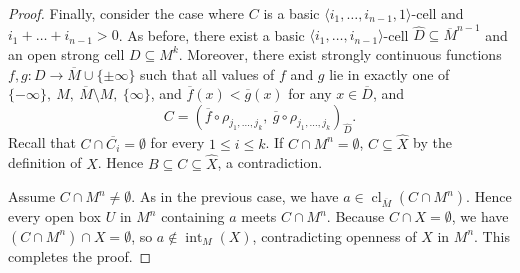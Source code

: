 \documentclass[10pt,a4paper]{amsart}
\DeclareMathOperator{\Int}{int}
\DeclareMathOperator{\cl}{cl}
\begin{document}
\begin{proof}
	Finally, consider the case where $C$ is a basic $\langle i_1,\dots,i_{n-1},1 \rangle$-cell and $i_1+\dots+i_{n-1} > 0$.
	As before, there exist a basic $\langle i_1,\dots,i_{n-1} \rangle$-cell $\hat{D} \subseteq \overline{M}^{n-1}$ and an open strong cell $D \subseteq M^k$.
	Moreover, there exist strongly continuous functions $f,g : D \to \overline{M} \cup \{\pm\infty\}$ such that all values of $f$ and $g$ lie in exactly one of
	$\{-\infty\},\ M,\ \overline{M}\setminus M,\ \{\infty\}$, and
	$\overline{f}(x) < \overline{g}(x)$ for any $x \in \overline{D}$, and
	\[
	C = (\overline{f} \circ \rho_{j_1,\ldots,j_k},\ \overline{g} \circ \rho_{j_1,\ldots,j_k})_{\hat{D}}.
	\]
		Recall that $C \cap \overline{C_i} = \emptyset$ for every $1 \leq i \leq k$.
	If $C \cap M^n = \emptyset$, $C \subseteq \hat{X}$ by the definition of $\hat{X}$.
	Hence $B \subseteq C \subseteq \hat{X}$, a contradiction.
	
	
	Assume $C \cap M^n \ne \emptyset$.
	As in the previous case, we have $a \in \cl_{\overline{M}}(C \cap M^n)$.
	Hence every open box $U$ in $M^n$ containing $a$ meets $C \cap M^n$.
	Because $C \cap X = \emptyset$, we have $(C \cap M^n) \cap X = \emptyset$, so $a \notin \Int_M(X)$, contradicting openness of $X$ in $M^n$.
	This completes the proof.
\end{proof}
\end{document}
